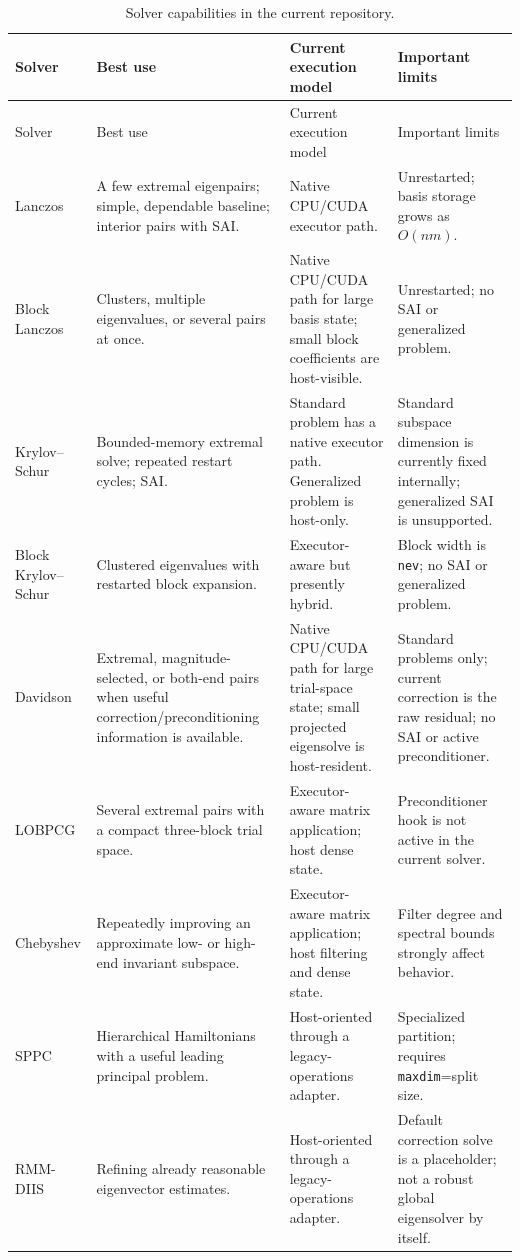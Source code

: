 \documentclass[11pt]{article}
\newcommand{\code}[1]{\texttt{#1}}
\begin{document}
\small
\begin{longtable}{P{0.16\textwidth} P{0.25\textwidth} P{0.20\textwidth} P{0.29\textwidth}}
\caption{Solver capabilities in the current repository.}
\label{tab:solver-summary}\\
\toprule
Solver & Best use & Current execution model & Important limits \\
\midrule
\endfirsthead
\toprule
Solver & Best use & Current execution model & Important limits \\
\midrule
\endhead
Lanczos & A few extremal eigenpairs; simple, dependable baseline; interior pairs with SAI. & Native CPU/CUDA executor path. & Unrestarted; basis storage grows as $O(nm)$. \\
Block Lanczos & Clusters, multiple eigenvalues, or several pairs at once. & Native CPU/CUDA path for large basis state; small block coefficients are host-visible. & Unrestarted; no SAI or generalized problem. \\
Krylov--Schur & Bounded-memory extremal solve; repeated restart cycles; SAI. & Standard problem has a native executor path. Generalized problem is host-only. & Standard subspace dimension is currently fixed internally; generalized SAI is unsupported. \\
Block Krylov--Schur & Clustered eigenvalues with restarted block expansion. & Executor-aware but presently hybrid. & Block width is \code{nev}; no SAI or generalized problem. \\
Davidson & Extremal, magnitude-selected, or both-end pairs when useful correction/preconditioning information is available. & Native CPU/CUDA path for large trial-space state; small projected eigensolve is host-resident. & Standard problems only; current correction is the raw residual; no SAI or active preconditioner. \\
LOBPCG & Several extremal pairs with a compact three-block trial space. & Executor-aware matrix application; host dense state. & Preconditioner hook is not active in the current solver. \\
Chebyshev & Repeatedly improving an approximate low- or high-end invariant subspace. & Executor-aware matrix application; host filtering and dense state. & Filter degree and spectral bounds strongly affect behavior. \\
SPPC & Hierarchical Hamiltonians with a useful leading principal problem. & Host-oriented through a legacy-operations adapter. & Specialized partition; requires \code{maxdim}=split size. \\
RMM-DIIS & Refining already reasonable eigenvector estimates. & Host-oriented through a legacy-operations adapter. & Default correction solve is a placeholder; not a robust global eigensolver by itself. \\
\bottomrule
\end{longtable}
\normalsize
\end{document}
